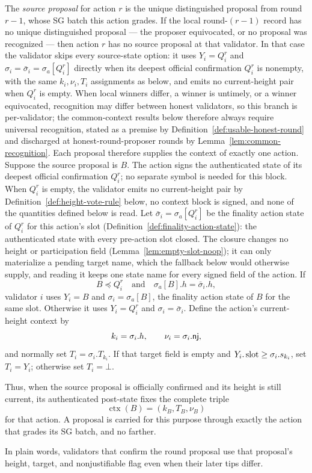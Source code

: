 \begin{definition}\label{def:ordinary-current-target}
The \emph{source proposal} for action \(r\) is the unique distinguished
proposal from round \(r-1\), whose SG batch this action grades.  If the
local round-\((r-1)\) record has no unique distinguished proposal --- the
proposer equivocated, or no proposal was recognized --- then action \(r\)
has no source proposal at that validator.  In that case the validator
skips every source-state option: it uses \(Y_i=Q_i^r\) and
\(\sigma_i=\bar\sigma_i=\sigma_a[Q_i^r]\) directly when its deepest
official confirmation \(Q_i^r\) is nonempty, with the same
\(k_i,\nu_i,T_i\) assignments as below, and emits no current-height
pair when \(Q_i^r\) is empty.  When local winners differ, a winner
is untimely, or a winner equivocated, recognition may differ between
honest validators, so this
branch is per-validator; the common-context results below therefore
always require universal recognition, stated as a premise by
Definition~\ref{def:usable-honest-round} and discharged at
honest-round-proposer rounds by Lemma~\ref{lem:common-recognition}.
Each proposal therefore supplies the context of exactly one action.
Suppose the source proposal is \(B\).  The action signs the
authenticated state of its deepest official confirmation \(Q_i^r\); no
separate symbol is needed for this block.  When
\(Q_i^r\) is empty, the validator emits no current-height pair by
Definition~\ref{def:height-vote-rule} below, no context block is signed, and
none of the quantities defined below is read.  Let
\(\bar\sigma_i=\sigma_a[Q_i^r]\) be the finality action state of
\(Q_i^r\) for this action's slot
(Definition~\ref{def:finality-action-state}): the authenticated state
with every pre-action slot closed.  The closure changes no height or
participation field (Lemma~\ref{lem:empty-slot-noop}); it can only
materialize a pending target name, which the fallback below would
otherwise supply, and reading it keeps one state name for every signed
field of the action.  If
\[
 B\preceq Q_i^r
 \quad\text{and}\quad
 \sigma_a[B].h=\bar\sigma_i.h,
\]
validator \(i\) uses \(Y_i=B\) and \(\sigma_i=\sigma_a[B]\), the
finality action state of \(B\) for the same slot.  Otherwise it
uses \(Y_i=Q_i^r\) and \(\sigma_i=\bar\sigma_i\).  Define
the action's current-height context by
\[
  k_i=\sigma_i.h,\qquad \nu_i=\sigma_i.\mathsf{nj},
\]
and normally set \(T_i=\sigma_i.T_{k_i}\).  If that target field is empty
and \(Y_i.\operatorname{\mathrm{slot}}\geq\sigma_i.s_{k_i}\), set \(T_i=Y_i\); otherwise set
\(T_i=\bot\).

Thus, when the source proposal is officially confirmed and its height is
still current, its
authenticated post-state fixes the complete triple
\[
  \operatorname{ctx}(B)=(k_B,T_B,\nu_B)
\]
for that action.  A proposal is carried for this purpose through exactly the
action that grades its SG batch, and no farther.

In plain words, validators that confirm the round proposal use that proposal's
height, target, and nonjustifiable flag even when their later tips differ.
\end{definition}

